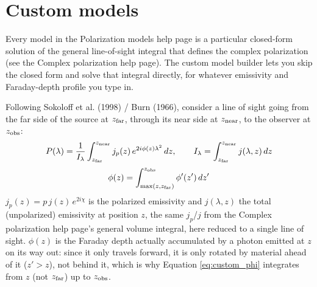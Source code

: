 \section{Custom models}
Every model in the Polarization models help page is a particular closed-form solution of the general line-of-sight integral that defines the complex polarization (see the Complex polarization help page). The custom model builder lets you skip the closed form and solve that integral directly, for whatever emissivity and Faraday-depth profile you type in.

Following Sokoloff et al. (1998) / Burn (1966), consider a line of sight going from the far side of the source at $z_{\rm far}$, through its near side at $z_{\rm near}$, to the observer at $z_{\rm obs}$:
\begin{equation}\label{eq:custom_P}
    \displaystyle P(\lambda) = \frac{1}{I_\lambda}\int_{z_{\rm far}}^{z_{\rm near}} j_p(z)\,e^{2i\phi(z)\lambda^2}\,dz, \qquad I_\lambda = \int_{z_{\rm far}}^{z_{\rm near}} j(\lambda,z)\,dz
\end{equation}
\begin{equation}\label{eq:custom_phi}
    \displaystyle \phi(z) = \int_{\max(z,z_{\rm far})}^{z_{\rm obs}} \phi'(z')\,dz'
\end{equation}
$j_p(z)=p\, j(z)\, e^{2i\chi}$ is the polarized emissivity and $j(\lambda,z)$ the total (unpolarized) emissivity at position $z$, the same $j_p$/$j$ from the Complex polarization help page's general volume integral, here reduced to a single line of sight. $\phi(z)$ is the Faraday depth actually accumulated by a photon emitted at $z$ on its way out: since it only travels forward, it is only rotated by material ahead of it ($z'>z$), not behind it, which is why Equation \ref{eq:custom_phi} integrates from $z$ (not $z_{\rm far}$) up to $z_{\rm obs}$.
\\


